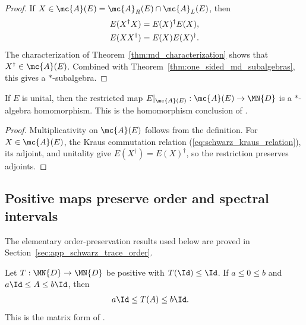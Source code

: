 \begin{proof}
    \leanok
    If $X\in\mc{A}(E)=\mc{A}_R(E)\cap\mc{A}_L(E)$, then
    \begin{align}
        E(X^\dagger X) & =E(X)^\dagger E(X), \notag \\
        E(XX^\dagger)  & =E(X)E(X)^\dagger.
        \notag
    \end{align}
    The characterization of Theorem~\ref{thm:md_characterization} shows that
    $X^\dagger\in\mc{A}(E)$.
    Combined with Theorem~\ref{thm:one_sided_md_subalgebras}, this gives a
    $*$-subalgebra.
\end{proof}

\begin{theorem}
    \label{thm:md_star_alg_hom}
    \leanok
    If $E$ is unital, then the restricted map
    $E|_{\mc{A}(E)}:\mc{A}(E)\to\MN{D}$ is a $*$-algebra homomorphism.
    This is the homomorphism conclusion of
    \cite[Theorem~5.7]{Wolf2012Quantum}.
\end{theorem}

\begin{proof}
    \leanok
    Multiplicativity on $\mc{A}(E)$ follows from the definition.
    For $X\in\mc{A}(E)$, the Kraus commutation relation
    (\ref{eq:schwarz_kraus_relation}), its adjoint, and unitality give
    $E(X^\dagger)=E(X)^\dagger$, so the restriction preserves adjoints.
\end{proof}

\subsection{Positive maps preserve order and spectral intervals}

The elementary order-preservation results used below are proved in
Section~\ref{sec:app_schwarz_trace_order}.

\begin{theorem}
    \label{thm:positive_map_image_bounded}
    \leanok
    Let $T:\MN{D}\to\MN{D}$ be positive with $T(\Id)\le\Id$.
    If $a\le0\le b$ and $a\Id\le A\le b\Id$, then
    \begin{align}
        a\Id
         & \le T(A)\le b\Id.
        \label{eq:schwarz_order_interval}
    \end{align}
    This is the matrix form of \cite[Equation~(5.21)]{Wolf2012Quantum}.
\end{theorem}

